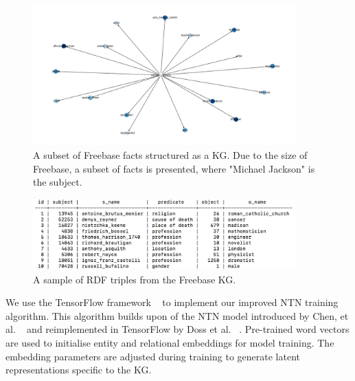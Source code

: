 \begin{figure}[H]
   	\centering
    	\includegraphics[width=0.9\textwidth, height=0.5\textwidth]{Freebase}
	\captionsetup{justification=centering}
	\caption{A subset of Freebase facts structured as a KG. Due to the size of Freebase, a subset of facts is presented, where "Michael Jackson" is the subject.}
\end{figure}

\noindent 

\begin{figure}[H]
   	\centering
    	\includegraphics[width=0.9\textwidth, height=0.3\textwidth]{freebase_fact_sample}
	\captionsetup{justification=centering}
	\caption{A sample of RDF triples from the Freebase KG.}
\end{figure}

\noindent We use the TensorFlow framework  \unskip~\citep{abadi2016tensorflow} to implement our improved NTN training algorithm. This algorithm builds upon of the NTN model introduced by Chen, et al. \unskip ~\citep{socher2013reasoning} and reimplemented in TensorFlow by Doss et al. \unskip ~\citep{Doss2015}. Pre-trained word vectors are used to initialise entity and relational embeddings for model training. The embedding parameters are adjusted during training to generate latent representations specific to the KG. \par

